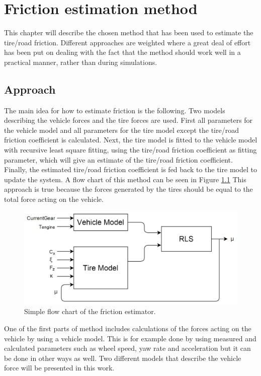 \chapter{Friction estimation method}

This chapter will describe the chosen method that has been used to estimate the tire/road friction. Different approaches are weighted where a great deal of effort has been put on dealing with the fact that the method should work well in a practical manner, rather than during simulations.

\section{Approach}
The main idea for how to estimate friction is the following. Two models describing the vehicle forces and the tire forces are used. First all parameters for the vehicle model and all parameters for the tire model except the tire/road friction coefficient is calculated. Next, the tire model is fitted to the vehicle model with recursive least square fitting, using the tire/road friction coefficient as fitting parameter, which will give an estimate of the tire/road friction coefficient. Finally, the estimated tire/road friction coefficient is fed back to the tire model to update the system. A flow chart of this method can be seen in Figure \ref{friction_estimator} This approach is true because the forces generated by the tires should be equal to the total force acting on the vehicle.

\begin{figure}[h]
	\centering
	\includegraphics[width=1.0\textwidth]{Pictures/friction_estimator}
	\caption {Simple flow chart of the friction estimator.}
	\label{friction_estimator}
\end{figure}

One of the first parts of method includes calculations of the forces acting on the vehicle by using a vehicle model. This is for example done by using measured and calculated parameters such as wheel speed, yaw rate and acceleration but it can be done in other ways as well. Two different models that describe the vehicle force will be presented in this work. 

